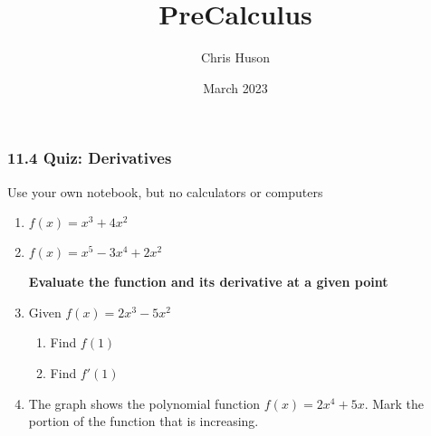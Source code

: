 \documentclass[12pt, twoside]{article}
\title{PreCalculus}
\author{Chris Huson}
\date{March 2023}
\begin{document}
\subsubsection*{11.4 Quiz: Derivatives}
Use your own notebook, but no calculators or computers

\begin{enumerate}

\subsubsection*{Find the derivative of each polynomial function}
\item $f(x)=x^3+4x^2$ \vspace{3cm}
\item $f(x)=x^5-3x^4+2x^2$ \par \vspace{3cm}

\textbf{Evaluate the function and its derivative at a given point}
\item Given $f(x)=2x^3-5x^2$
\begin{enumerate}[itemsep=3cm]
    \item Find $f(1)$
    \item Find $f'(1)$
\end{enumerate} \vspace{2cm}

\newpage
\item The graph shows the polynomial function $\displaystyle f(x)=2x^4+5x$. Mark the portion of the function that is increasing.
    \begin{center}
    \end{center}


\end{enumerate}
\end{document}
